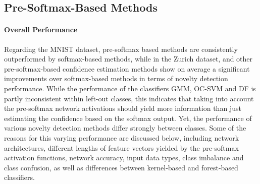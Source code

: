 \documentclass[10pt]{article}
\begin{document}
\subsection{Pre-Softmax-Based Methods}
\paragraph{Overall Performance}  Regarding the \gls{MNIST} dataset, pre-softmax based methods are consistently outperformed by softmax-based methods, while in the Zurich dataset,  and other pre-softmax-based confidence estimation methods show on average a significant improvements over softmax-based methods in terms of novelty detection performance. While the performance of the classifiers \gls{GMM}, \gls{OC-SVM} and \gls{DF} is partly inconsistent within left-out classes, this indicates that taking into account the pre-softmax network activations should yield more information than just estimating the confidence based on the softmax output. Yet, the performance of various novelty detection methods differ strongly between classes. Some of the reasons for this varying performance are discussed below, including network architectures, different lengths of feature vectors yielded by the pre-softmax activation functions, network accuracy, input data types, class imbalance and class confusion, as well as differences between kernel-based and forest-based classifiers.

\end{document}

